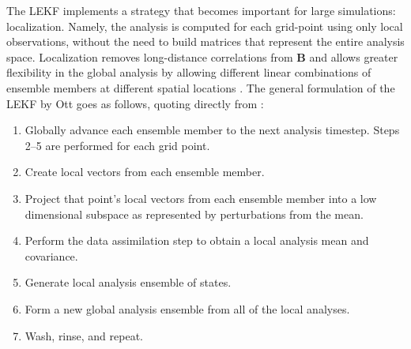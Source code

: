 \documentclass[10pt,letterpaper]{article}
\begin{document}
The LEKF implements a strategy that becomes important for large simulations: localization.
Namely, the analysis is computed for each grid-point using only local observations, without the need to build matrices that represent the entire analysis space.
Localization removes long-distance correlations from $\mathbf{B}$ and allows greater flexibility in the global analysis by allowing different linear combinations of ensemble members at different spatial locations \cite{kalnay2007a}.
The general formulation of the LEKF by Ott goes as follows, quoting directly from \cite{ott2004local}:
\begin{enumerate}
\item Globally advance each ensemble member to the next analysis timestep. Steps 2--5 are performed for each grid point.
\item Create local vectors from each ensemble member.
\item Project that point's local vectors from each ensemble member into a low dimensional subspace as represented by perturbations from the mean.
\item Perform the data assimilation step to obtain a local analysis mean and covariance.
\item Generate local analysis ensemble of states.
\item Form a new global analysis ensemble from all of the local analyses.
\item Wash, rinse, and repeat.
\end{enumerate}
\end{document}

